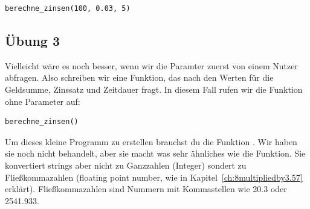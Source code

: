 \begin{Verbatim}[frame=single]
berechne_zinsen(100, 0.03, 5)
\end{Verbatim}

\subsection*{Übung 3}
Vielleicht wäre es noch besser, wenn wir die Paramter zuerst von einem Nutzer abfragen. Also schreiben wir eine Funktion, das nach den Werten für die Geldsumme, Zinssatz und Zeitdauer fragt. In diesem Fall rufen wir die Funktion ohne Parameter auf:

\begin{Verbatim}[frame=single]
berechne_zinsen()
\end{Verbatim}

\noindent
Um dieses kleine Programm zu erstellen brauchst du die Funktion . Wir haben sie noch nicht behandelt, aber sie macht was sehr ähnliches wie die  Funktion. Sie konvertiert strings aber nicht zu Ganzzahlen (Integer) sondert zu Fließkommazahlen (floating point number, wie in Kapitel~\ref{ch:8multipliedby3.57} erklärt). Fließkommazahlen sind Nummern mit Kommastellen wie 20.3 oder 2541.933.

\newpage
